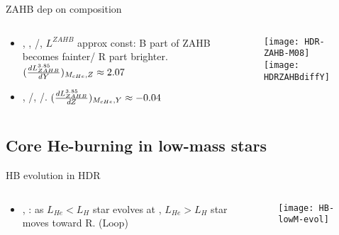 \begin{frame}{ZAHB dep on composition}
\begin{columns}[T]
\begin{column}{0.55\textwidth}
\begin{itemize}
\item {}, , /, $L^{ZAHB}$ approx const: B part of ZAHB becomes fainter/ R part brighter. $(\TDy{Y}{L_{ZAHB}^{3.85}})_{M_{cHe},Z}\approx2.07$
\item {}, /, /. $(\TDy{Z}{L_{ZAHB}^{3.85}})_{M_{cHe},Y}\approx-0.04$
\end{itemize}
\end{column}
\begin{column}{0.45\textwidth}
\begin{figure}[!ht]
\texttt{[image: HDR-ZAHB-M08]}\label{fig:HDR-ZAHB-M08}
\texttt{[image: HDRZAHBdiffY]}\label{fig:HDRZAHBdiffY}
\end{figure}
\end{column}
\end{columns}
\end{frame}

\subsection{Core He-burning in low-mass stars}


\begin{frame}{HB evolution in HDR}
\begin{columns}[T]
\begin{column}{0.4\textwidth}
\begin{itemize}
\item {}, : as $L_{He}<L_H$ star evolves at , $L_{He}>L_H$ star moves toward R. (Loop)
\end{itemize}
\end{column}
\begin{column}{0.6\textwidth}
\begin{figure}[!ht]
\texttt{[image: HB-lowM-evol]}\label{fig:HB-lowM-evol}
\end{figure}
\end{column}
\end{columns}
\end{frame}



